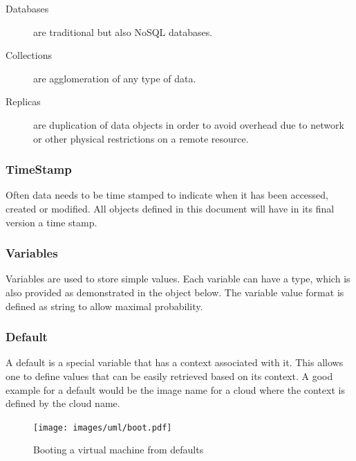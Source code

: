 \documentclass[10pt]{article}
\begin{document}
\begin{description}
\item[Databases] are traditional but also NoSQL databases.

\item[Collections] are agglomeration of any type of data.

\item[Replicas] are duplication of data objects in order to avoid
  overhead due to network or other physical restrictions on a remote
  resource.

\end{description}


\subsubsection{TimeStamp}

Often data needs to be time stamped to indicate when it has been
accessed, created or modified. All objects defined in this document
will have in its final version a time stamp.


\subsubsection{Variables}

Variables are used to store simple values. Each variable can have a
type, which is also provided as demonstrated in the object below. The
variable value format is defined as string to allow maximal
probability. 


\subsubsection{Default}

A default is a special variable that has a context associated with
it. This allows one to define values that can be easily retrieved
based on its context. A good example for a default would be the image
name for a cloud where the context is defined by the cloud name.



\begin{figure}[!h]
\centering
\texttt{[image: images/uml/boot.pdf]}
\caption{Booting a virtual machine from defaults}\label{F:uml-boot}
\end{figure}
\end{document}
